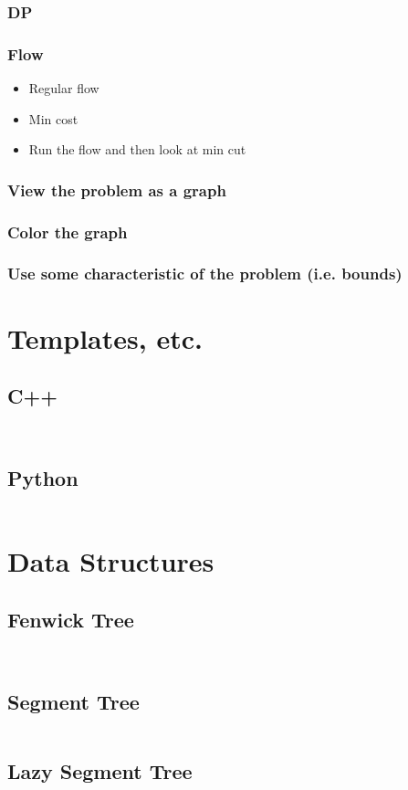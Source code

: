 \documentclass[8pt,a4paper,landscape,oneside]{amsart}
\newcommand{\codec}[1]{\inputminted[fontsize=\large,tabsize=2,baselinestretch=1]{cpp}{code/#1}}
\newcommand{\codep}[1]{\inputminted[fontsize=\large,tabsize=2,baselinestretch=1]{py}{code/#1}}
\begin{document}
\begin{multicols*}{2}
\begin{large}
\subsubsection{DP}
\subsubsection{Flow}
\begin{itemize}
    \item Regular flow
    \item Min cost
    \item Run the flow and then look at min cut
\end{itemize}
\subsubsection{View the problem as a graph}
\subsubsection{Color the graph}
\subsubsection{Use some characteristic of the problem (i.e. bounds)}
\section{Templates, etc.}
\subsection{C++}
\codec{template.cpp}
\codec{input.cpp}
\subsection{Python}
\codep{template.py}
\section{Data Structures}
\subsection{Fenwick Tree}
\codep{fenwicktree.py}
\codec{fenwicktree.cpp}
\subsection{Segment Tree}
\codep{sgmtree.cpp}
\subsection{Lazy Segment Tree}
\codec{lazysgmtree.cpp}

\end{large}
\end{multicols*}
\end{document}

